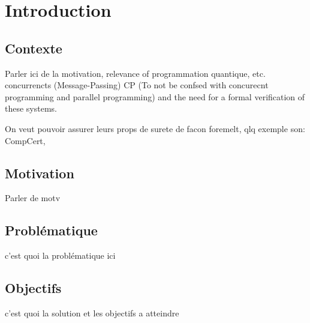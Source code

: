 %
\chapter{Introduction}
\label{ch::chapitre1}

\section{Contexte}


Parler ici de la motivation, relevance of programmation quantique, etc. concurrencts (Message-Passing) CP (To not be confsed with concurecnt programming and parallel programming) and the need for a formal verification of these systems.

On veut pouvoir assurer leurs props de surete de facon foremelt, qlq exemple son: CompCert, 


\section{Motivation}

Parler de motv

\section{Problématique}

c'est quoi la problématique ici

\section{Objectifs}

c'est quoi la solution et les objectifs a atteindre